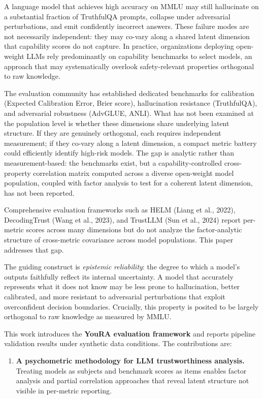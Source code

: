 
A language model that achieves high accuracy on MMLU may still hallucinate on a substantial fraction of TruthfulQA prompts, collapse under adversarial perturbations, and emit confidently incorrect answers. These failure modes are not necessarily independent: they may co-vary along a shared latent dimension that capability scores do not capture. In practice, organizations deploying open-weight LLMs rely predominantly on capability benchmarks to select models, an approach that may systematically overlook safety-relevant properties orthogonal to raw knowledge.

The evaluation community has established dedicated benchmarks for calibration (Expected Calibration Error, Brier score), hallucination resistance (TruthfulQA), and adversarial robustness (AdvGLUE, ANLI). What has not been examined at the population level is whether these dimensions share underlying latent structure. If they are genuinely orthogonal, each requires independent measurement; if they co-vary along a latent dimension, a compact metric battery could efficiently identify high-risk models. The gap is analytic rather than measurement-based: the benchmarks exist, but a capability-controlled cross-property correlation matrix computed across a diverse open-weight model population, coupled with factor analysis to test for a coherent latent dimension, has not been reported.

Comprehensive evaluation frameworks such as HELM (Liang et al., 2022), DecodingTrust (Wang et al., 2023), and TrustLLM (Sun et al., 2024) report per-metric scores across many dimensions but do not analyze the factor-analytic structure of cross-metric covariance across model populations. This paper addresses that gap.

The guiding construct is \textit{epistemic reliability}: the degree to which a model's outputs faithfully reflect its internal uncertainty. A model that accurately represents what it does not know may be less prone to hallucination, better calibrated, and more resistant to adversarial perturbations that exploit overconfident decision boundaries. Crucially, this property is posited to be largely orthogonal to raw knowledge as measured by MMLU.

This work introduces the \textbf{YouRA evaluation framework} and reports pipeline validation results under synthetic data conditions. The contributions are:

\begin{enumerate}
\item \textbf{A psychometric methodology for LLM trustworthiness analysis.} Treating models as subjects and benchmark scores as items enables factor analysis and partial correlation approaches that reveal latent structure not visible in per-metric reporting.
\end{enumerate}

